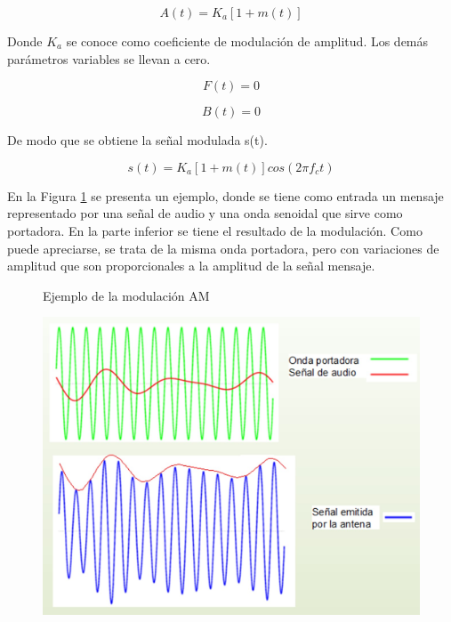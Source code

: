 	\begin{equation} \label{equ_quincex}
		A(t)= K_a[1+m(t)]
	\end{equation} 

Donde $K_a$ se conoce como coeficiente de modulación de amplitud. Los demás parámetros variables se llevan a cero.

	\begin{equation} \label{equ_dieciseisx}
		F(t)= 0
    \end{equation}
    
    \begin{equation} \label{equ_diecisitex}
		B(t)= 0
	\end{equation} 
	
De modo que se obtiene la señal modulada s(t).

	\begin{equation} \label{equ_diecioschox}
		s(t)=K_a [1+m(t)]cos(2 \pi f_ct)
	\end{equation} 

En la Figura \ref{fig:am_t} se presenta un ejemplo, donde se tiene como entrada un mensaje representado por una señal de audio y una onda senoidal que sirve como portadora. En la parte inferior se tiene el resultado de la modulación. Como puede apreciarse, se trata de la misma onda portadora, pero con variaciones de amplitud que son proporcionales a la amplitud de la señal mensaje.
\begin{figure}[h!]
	\captionsetup{justification = raggedright, singlelinecheck = false}
	\caption{Ejemplo de la modulación AM} 
	\centering
	\includegraphics[scale=0.5]{Imagenes/am3.jpg}
	\label{fig:am_t}
   \caption*{}
\end{figure}

